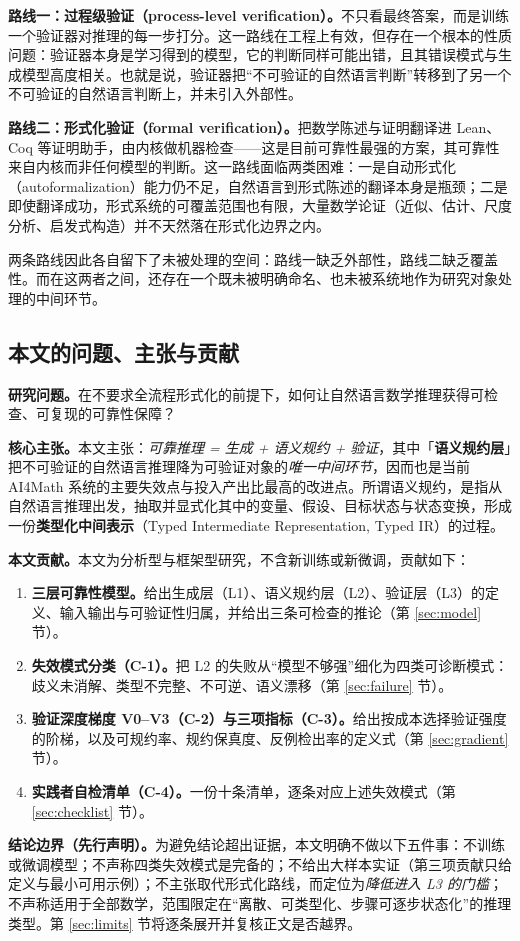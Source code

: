 \textbf{路线一：过程级验证（process-level verification）。}不只看最终答案，而是训练一个验证器对推理的每一步打分\citep{lightman2023let,uesato2022solving}。这一路线在工程上有效，但存在一个根本的性质问题：验证器本身是学习得到的模型，它的判断同样可能出错，且其错误模式与生成模型高度相关。也就是说，验证器把“不可验证的自然语言判断”转移到了另一个不可验证的自然语言判断上，并未引入外部性。

\textbf{路线二：形式化验证（formal verification）。}把数学陈述与证明翻译进 Lean\citep{moura2021lean,mathlib2020lean}、Coq\citep{bertot2004interactive} 等证明助手，由内核做机器检查——这是目前可靠性最强的方案，其可靠性来自内核而非任何模型的判断\citep{wadler2015propositions}。这一路线面临两类困难：一是自动形式化（autoformalization）能力仍不足，自然语言到形式陈述的翻译本身是瓶颈\citep{szegedy2020promising,wu2022autoformalization}；二是即使翻译成功，形式系统的可覆盖范围也有限，大量数学论证（近似、估计、尺度分析、启发式构造）并不天然落在形式化边界之内。

两条路线因此各自留下了未被处理的空间：路线一缺乏外部性，路线二缺乏覆盖性。而在这两者之间，还存在一个既未被明确命名、也未被系统地作为研究对象处理的中间环节。

\subsection{本文的问题、主张与贡献}

\textbf{研究问题。}在不要求全流程形式化的前提下，如何让自然语言数学推理获得可检查、可复现的可靠性保障？

\textbf{核心主张。}本文主张：\emph{可靠推理 = 生成 + 语义规约 + 验证}，其中「\textbf{语义规约层}」把不可验证的自然语言推理降为可验证对象的\emph{唯一中间环节}，因而也是当前 AI4Math 系统的主要失效点与投入产出比最高的改进点。所谓语义规约，是指从自然语言推理出发，抽取并显式化其中的变量、假设、目标状态与状态变换，形成一份\textbf{类型化中间表示}（Typed Intermediate Representation, Typed IR）的过程。

\textbf{本文贡献。}本文为分析型与框架型研究，不含新训练或新微调，贡献如下：

\begin{enumerate}[leftmargin=1.6em,itemsep=2pt]
  \item \textbf{三层可靠性模型。}给出生成层（L1）、语义规约层（L2）、验证层（L3）的定义、输入输出与可验证性归属，并给出三条可检查的推论（第 \ref{sec:model} 节）。
  \item \textbf{失效模式分类（C-1）。}把 L2 的失败从“模型不够强”细化为四类可诊断模式：歧义未消解、类型不完整、不可逆、语义漂移（第 \ref{sec:failure} 节）。
  \item \textbf{验证深度梯度 V0--V3（C-2）与三项指标（C-3）。}给出按成本选择验证强度的阶梯，以及可规约率、规约保真度、反例检出率的定义式（第 \ref{sec:gradient} 节）。
  \item \textbf{实践者自检清单（C-4）。}一份十条清单，逐条对应上述失效模式（第 \ref{sec:checklist} 节）。
\end{enumerate}

\textbf{结论边界（先行声明）。}为避免结论超出证据，本文明确不做以下五件事：不训练或微调模型；不声称四类失效模式是完备的；不给出大样本实证（第三项贡献只给定义与最小可用示例）；不主张取代形式化路线，而定位为\emph{降低进入 L3 的门槛}；不声称适用于全部数学，范围限定在“离散、可类型化、步骤可逐步状态化”的推理类型。第 \ref{sec:limits} 节将逐条展开并复核正文是否越界。
